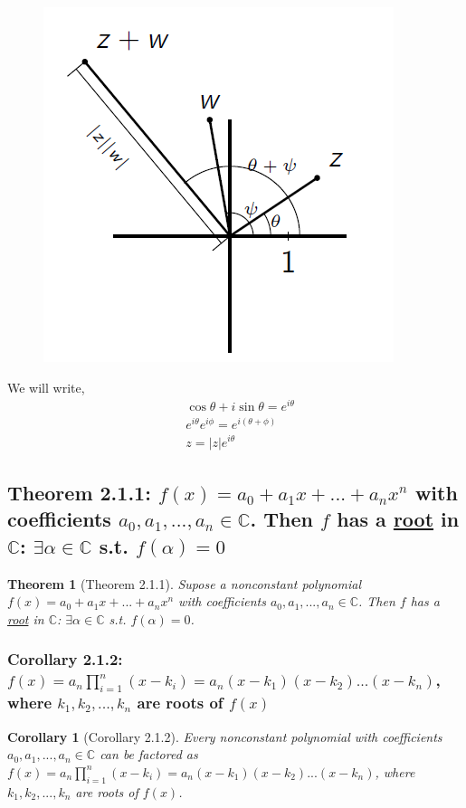 \documentclass[11pt,a4paper]{article}
\newtheorem{theorem}{Theorem}
\newtheorem{corollary}{Corollary}
\begin{document}
\begin{center}\begin{figure}[htbp]
    \centering
    \includegraphics[scale=0.8]{Complex multiplication.png}
\end{figure}\end{center}
We will write,
\begin{equation}
    \begin{aligned}
        &\cos \theta+i\sin\theta=e^{i\theta}\\
        &e^{i\theta}e^{i\phi}=e^{i(\theta+\phi)}\\
        &z=|z|e^{i\theta}
    \end{aligned}
    \nonumber
\end{equation}
\subsection{Theorem 2.1.1: $f(x)=a_0+a_1x+...+a_nx^n$ with coefficients $a_0,a_1,...,a_n\in\mathbb{C}$. Then $f$ has a \underline{root} in $\mathbb{C}$: $\exists \alpha\in\mathbb{C}$ s.t. $f(\alpha)=0$}
\begin{theorem}[Theorem 2.1.1]
Supose a nonconstant polynomial $f(x)=a_0+a_1x+...+a_nx^n$ with coefficients $a_0,a_1,...,a_n\in\mathbb{C}$. Then $f$ has a \underline{root} in $\mathbb{C}$: $\exists \alpha\in\mathbb{C}$ s.t. $f(\alpha)=0$.
\end{theorem}
\subsubsection{Corollary 2.1.2: $f(x)=a_n\prod_{i=1}^n(x-k_i)=a_n(x-k_1)(x-k_2)...(x-k_n)$, where $k_1,k_2,...,k_n$ are roots of $f(x)$}
\begin{corollary}[Corollary 2.1.2]
    Every nonconstant polynomial with coefficients $a_0,a_1,...,a_n\in\mathbb{C}$ can be factored as $f(x)=a_n\prod_{i=1}^n(x-k_i)=a_n(x-k_1)(x-k_2)...(x-k_n)$, where $k_1,k_2,...,k_n$ are roots of $f(x)$.
\end{corollary}
\end{document}
